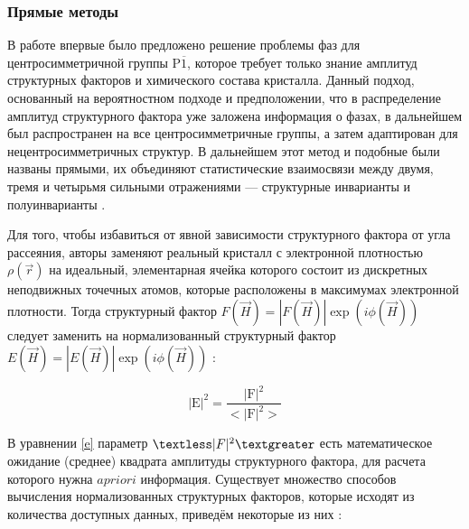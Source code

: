 \subsubsection{Прямые методы}

В работе \cite{hauptman_solution_1954} впервые было предложено решение проблемы фаз для центросимметричной группы P$\overline{1}$, которое требует только знание амплитуд структурных факторов и химического состава кристалла. Данный подход, основанный на вероятностном подходе и предположении, что в распределение амплитуд структурного фактора уже заложена информация о фазах, в дальнейшем был распространен на все центросимметричные группы, а затем адаптирован для нецентросимметричных структур. В дальнейшем этот метод и подобные были названы прямыми, их объединяют статистические взаимосвязи между двумя, тремя и четырьмя сильными отражениями --- структурные инварианты и полуинварианты \cite{hauptman_direct_1986}. 

Для того, чтобы избавиться от явной зависимости структурного фактора от угла рассеяния, авторы заменяют реальный кристалл с электронной плотностью $\rho(\overrightarrow{r})$ на идеальный, элементарная ячейка которого состоит из дискретных неподвижных точечных атомов, которые расположены в максимумах электронной плотности. Тогда структурный фактор $F(\overrightarrow{H})=|F(\overrightarrow{H})|\exp(i\phi(\overrightarrow{H}))$ следует заменить на нормализованный структурный фактор $E(\overrightarrow{H}) = |E(\overrightarrow{H})|\exp(i\phi(\overrightarrow{H}))$ \cite{giacovazzo_direct_1998}:

\begin{equation}\label{e}
	\mathrm{|E|^2 = \frac{|F|^2}{<|F|^2>}}
\end{equation}


В уравнении \ref{e} параметр $\textless|F|^2\textgreater$ есть математическое ожидание (среднее) квадрата амплитуды структурного фактора, для расчета которого нужна $a priori$ информация. Существует множество способов вычисления нормализованных структурных факторов, которые исходят из количества доступных данных, приведём некоторые из них \cite{giacovazzo_international_2010}:

